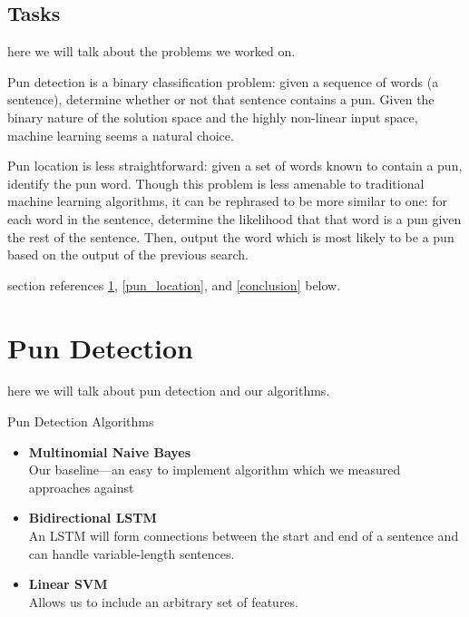 \documentclass{article}
\begin{document}
\subsection{Tasks}

here we will talk about the problems we worked on.

Pun detection is a binary classification problem: given a sequence of words (a
sentence), determine whether or not that sentence contains a pun. Given the
binary nature of the solution space and the highly non-linear input space,
machine learning seems a natural choice.

Pun location is less straightforward: given a set of words known to contain a
pun, identify the pun word. Though this problem is less amenable to traditional
machine learning algorithms, it can be rephrased to be more similar to one: for
each word in the sentence, determine the likelihood that that word is a pun
given the rest of the sentence. Then, output the word which is most likely to
be a pun based on the output of the previous search.

section references \ref{pun_detection}, \ref{pun_location}, and
\ref{conclusion} below.


\section{Pun Detection}
\label{pun_detection}

here we will talk about pun detection and our algorithms.

\begin{block}{Pun Detection Algorithms}
	{\large 
		\begin{itemize}
			\item {\textbf{Multinomial Naive Bayes}\\
				Our baseline---an easy to implement algorithm which we measured approaches against
			}
			\item {\textbf{Bidirectional LSTM}\\
				An LSTM will form connections between the start and end of a sentence and can handle variable-length sentences.
			}
			\item {\textbf{Linear SVM}\\ 
				Allows us to include an arbitrary set of features.
			}
		\end{itemize}
	}
\end{block}
\end{document}
